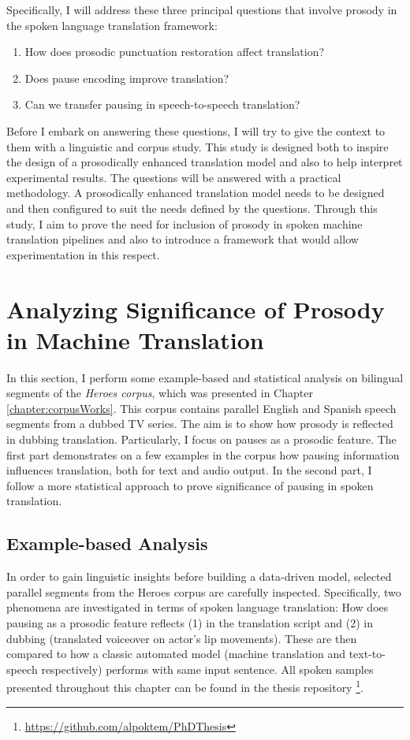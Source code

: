 Specifically, I will address these three principal questions that involve prosody in the spoken language translation framework:

\begin{enumerate}
    \item How does prosodic punctuation restoration affect translation?
    \item Does pause encoding improve translation?
    \item Can we transfer pausing in speech-to-speech translation?
\end{enumerate}

Before I embark on answering these questions, I will try to give the context to them with a linguistic and corpus study. This study is designed both to inspire the design of a prosodically enhanced translation model and also to help interpret experimental results. The questions will be answered with a practical methodology. A prosodically enhanced translation model needs to be designed and then configured to suit the needs defined by the questions. Through this study, I aim to prove the need for inclusion of prosody in spoken machine translation pipelines and also to introduce a framework that would allow experimentation in this respect. 

\section{Analyzing Significance of Prosody in Machine Translation}
\label{transProse:analysis}
In this section, I perform some example-based and statistical analysis on bilingual segments of the \textit{Heroes corpus}, which was presented in Chapter \ref{chapter:corpusWorks}. This corpus contains parallel English and Spanish speech segments from a dubbed TV series. The aim is to show how prosody is reflected in dubbing translation. Particularly, I focus on pauses as a prosodic feature. The first part demonstrates on a few examples in the corpus how pausing information influences translation, both for text and audio output. In the second part, I follow a more statistical approach to prove significance of pausing in spoken translation. 

\subsection{Example-based Analysis}
\label{subsection:heroes_examples}
In order to gain linguistic insights before building a data-driven model, selected parallel segments from the Heroes corpus are carefully inspected. Specifically, two phenomena are investigated in terms of spoken language translation: How does pausing as a prosodic feature reflects (1) in the translation script and (2) in dubbing (translated voiceover on actor's lip movements). These are then compared to how a classic automated model (machine translation and text-to-speech respectively) performs with same input sentence. All spoken samples presented throughout this chapter can be found in the thesis repository \footnote{\url{https://github.com/alpoktem/PhDThesis}}.

